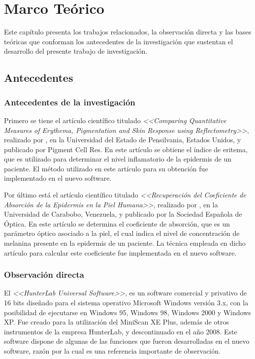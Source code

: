 \chapter{Marco Te\'{o}rico}

Este cap\'{i}tulo presenta los trabajos relacionados, la observaci\'{o}n directa y las bases te\'{o}ricas que conforman los antecedentes de la investigaci\'{o}n que sustentan el desarrollo del presente trabajo de investigaci\'{o}n.

	\section{Antecedentes}
	
		\subsection{Antecedentes de la investigaci\'{o}n}
			
			Primero se tiene el art\'{i}culo cient\'{i}fico titulado \textit{<<Comparing Quantitative Measures of Erythema, Pigmentation and Skin Response using Reflectometry>>}, realizado por \cite{Wagner}, en la Universidad del Estado de Pensilvania, Estados Unidos, y publicado por Pigment Cell Res. En este art\'{i}culo se obtiene el \'{i}ndice de eritema, que es utilizado para determinar el nivel inflamatorio de la epidermis de un paciente. El m\'{e}todo utilizado en este art\'{i}culo para su obtenci\'{o}n fue implementado en el nuevo software.
			
			Por	\'{u}ltimo est\'{a} el art\'{i}culo cient\'{i}fico titulado \textit{<<Recuperaci\'{o}n del Coeficiente de Absorci\'{o}n de la Epidermis en la Piel Humana>>}, realizado por \cite{Narea}, en la Universidad de Carabobo, Venezuela, y publicado por la Sociedad Espa\~{n}ola de \'{O}ptica. En este art\'{i}culo se determina el coeficiente de absorci\'{o}n, que es un par\'{a}metro \'{o}ptico asociado a la piel, el cual indica el nivel de concentraci\'{o}n de melanina presente en la epidermis de un paciente. La t\'{e}cnica empleada en dicho art\'{i}culo para calcular este coeficiente fue implementada en el nuevo software.

	\subsection{Observaci\'{o}n directa}
		
			El \textit{<<HunterLab Universal Software>>}, es un software comercial y privativo de 16 bits dise\~{n}ado para el sistema operativo Microsoft Windows versi\'{o}n 3.x, con la posibilidad de ejecutarse en Windows 95, Windows 98, Windows 2000 y Windows XP. Fue creado para la utilizaci\'{o}n del MiniScan XE Plus, adem\'{a}s de otros instrumentos de la empresa HunterLab, y descontinuado en el a\~{n}o 2008. Este software dispone de algunas de las funciones que fueron desarrolladas en el nuevo software, raz\'{o}n por la cual es una referencia importante de observaci\'{o}n.

